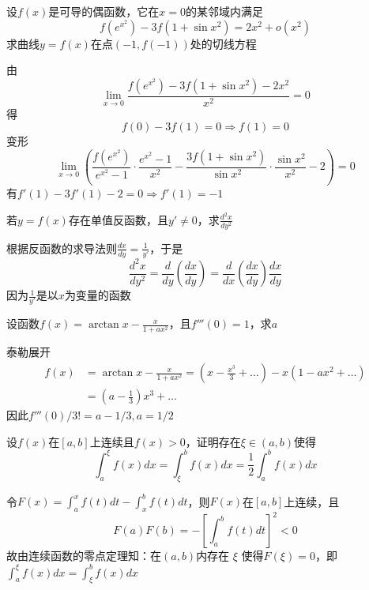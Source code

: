 \documentclass{article}
\begin{document}
\begin{examplle}[]
设\(f(x)\)是可导的偶函数，它在\(x=0\)的某邻域内满足
\begin{equation*}
f(e^{x^2})-3f(1+\sin x^2)=2x^2+o(x^2)
\end{equation*}
求曲线\(y=f(x)\)在点\((-1,f(-1))\)处的切线方程

由
\begin{equation*}
\lim_{x\to0}\frac{f(e^{x^2})-3f(1+\sin x^2)-2x^2}{x^2}=0
\end{equation*}
得
\begin{equation*}
f(0)-3f(1)=0\Rightarrow f(1)=0
\end{equation*}
变形
\begin{equation*}
\lim_{x\to0}\left(
\frac{f(e^{x^2})}{e^{x^2}-1}\cdot\frac{e^{x^2}-1}{x^2}-
\frac{3f(1+\sin x^2)}{\sin x^2}\cdot\frac{\sin x^2}{x^2}-2
\right)=0
\end{equation*}
有\(f'(1)-3f'(1)-2=0\Rightarrow f'(1)=-1\)
\end{examplle}

\begin{examplle}[]
若\(y=f(x)\)存在单值反函数，且\(y'\neq0\)，求\(\frac{d^2x}{dy^2}\)

根据反函数的求导法则\(\frac{dx}{dy}=\frac{1}{y'}\)，于是
\begin{equation*}
\frac{d^2x}{dy^2}=\frac{d}{dy}\left(\frac{dx}{dy}\right)=
\frac{d}{dx}\left(\frac{dx}{dy}\right)\frac{dx}{dy}
\end{equation*}
因为\(\frac{1}{y'}\)是以\(x\)为变量的函数
\end{examplle}

\begin{examplle}[]
设函数\(f(x)=\arctan x-\frac{x}{1+ax^2}\)，且\(f'''(0)=1\)，求\(a\)

泰勒展开
\begin{align*}
f(x)&=\arctan x-\frac{x}{1+ax^2}=
\left(x-\frac{x^3}{3}+\dots
\right)-x(1-ax^2+\dots)\\
&=(a-\frac{1}{3})x^3+\dots
\end{align*}
因此\(f'''(0)/3!=a-1/3,a=1/2\)
\end{examplle}

\begin{examplle}[]
设\(f(x)\)在\([a,b]\)上连续且\(f(x)>0\)，证明存在\(\xi\in(a,b)\)使得
\begin{equation*}
\int_a^\xi f(x)dx=\int_\xi^bf(x)dx=\frac{1}{2}\int_a^bf(x)dx
\end{equation*}

令\(F(x)=\int_a^xf(t)dt-\int_x^bf(t)dt\)，则\(F(x)\)在\([a,b]\)上连续，且
\begin{equation*}
F(a)F(b)=-\left[\int_a^bf(t)dt\right]^2<0
\end{equation*}
故由连续函数的零点定理知：在\((a,b)\)内存在 \(\xi\) 使得\(F(\xi)=0\)，即\(\int_a^\xi f(x)dx=\int_\xi^bf(x)dx\)
\end{examplle}
\end{document}
